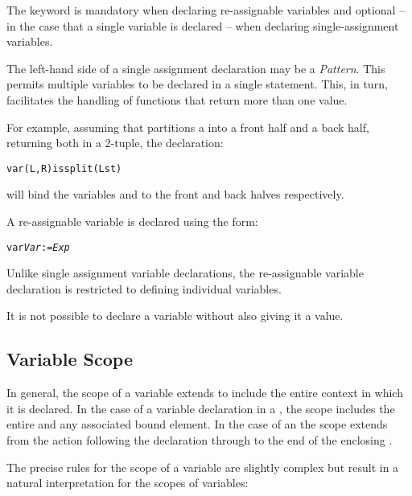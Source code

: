 The  keyword is mandatory when declaring re-assignable variables and optional -- in the case that a single variable is declared -- when declaring single-assignment variables.

The left-hand side of a single assignment declaration may be a \emph{Pattern}. This permits multiple variables to be declared in a single statement. This, in turn, facilitates the handling of functions that return more than one value.

For example, assuming that  partitions a  into a front half and a back half, returning both in a 2-tuple, the declaration:
\begin{alltt}
var (L,R) is split(Lst)
\end{alltt}
will bind the variables  and  to the front and back halves respectively.

A re-assignable variable is declared using the form:
\begin{alltt}
var \emph{Var} := \emph{Exp}
\end{alltt}

\begin{aside}
Unlike single assignment variable declarations, the re-assignable variable declaration is restricted to defining individual variables.
\end{aside}

\begin{aside}
It is not possible to declare a variable without also giving it a value.
\end{aside}

\subsection{Variable Scope}
\label{scope}
\hypertarget{Scope}{}

In general, the scope of a variable extends to include the entire context in which it is declared. In the case of a variable declaration in a , the scope includes the entire  and any associated bound element. In the case of an  the scope extends from the action following the declaration through to the end of the enclosing .

The precise rules for the scope of a variable are slightly complex but result in a natural interpretation for the scopes of variables:

